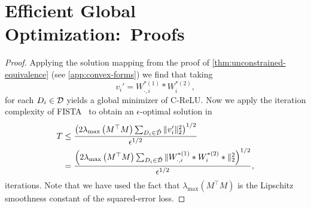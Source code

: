 
\section{Efficient Global Optimization:\ Proofs}\label{app:optimization}

\gatedComplexity*
\begin{proof}
	Applying the solution mapping from the proof of \cref{thm:unconstrained-equivalence} (see \cref{app:convex-forms}) we find that taking
	\[
		v_i' = W^{*(1)}_{\cdot, i} * W^{*(2)}_{i},
	\]
	for each \( D_i \in \mathcal{D} \) yields a global minimizer of C-ReLU.
	Now we apply the iteration complexity of FISTA~\citep[Theorem 4.4]{beck2009fista} to obtain an \( \epsilon \)-optimal solution in
	\begin{align*}
		T & \leq \frac{\left(2 \lambda_{\text{max}}\left(M^\top M\right)\sum_{D_i \in \tilde {\mathcal{D}}} \|v_i'\|_2^2\right)^{1/2}}{\epsilon^{1/2}}            \\
		  & = \frac{\left(2 \lambda_{\text{max}}\left(M^\top M\right)\sum_{D_i \in \tilde {\mathcal{D}}} \|W^{*(1)}_{\cdot, i}* W^{*(2)}_{i}*\|_2^2\right)^{1/2}}{\epsilon^{1/2}},
	\end{align*}
	iterations.
	Note that we have used the fact that \( \lambda_{\text{max}}(M^\top M) \) is the Lipschitz smoothness constant of the squared-error loss.

\end{proof}

